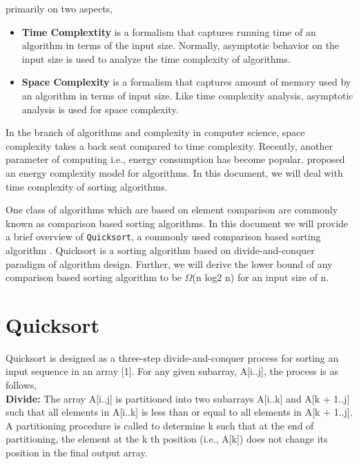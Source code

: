 \documentclass{article}
\begin{document}
\begin{multicols}{2}
primarily on two aspects,
\begin{itemize}
\itemsep0em
\item \textbf{Time Complextity} is a formalism that captures
running time of an algorithm in terms of
the input size. Normally, asymptotic behavior
on the input size is used to analyze the time
complexity of algorithms.
\item \textbf{Space Complexity} is a formalism that captures
amount of memory used by an algorithm
in terms of input size. Like time complexity
analysis, asymptotic analysis is used for space
complexity.\\
\end{itemize}
In the branch of algorithms and complexity in computer
science, space complexity takes a back seat
compared to time complexity. Recently, another
parameter of computing i.e., energy consumption
has become popular. \citep{4} proposed an energy
complexity model for algorithms. In this document,
we will deal with time complexity of sorting
algorithms.\par
One class of algorithms which are based on element
comparison are commonly known as comparison
based sorting algorithms. In this document we
will provide a brief overview of \texttt{Quicksort}, a commonly
used comparison based sorting algorithm \citep{2}.
Quicksort is a sorting algorithm based on divide-and-conquer
paradigm of algorithm design. Further,
we will derive the lower bound of any comparison
based sorting algorithm to be $\Omega$(n log2 n)
for an input size of n.
\\
\section{Quicksort}
Quicksort is designed as a three-step divide-and-conquer
process for sorting an input sequence in
an array [1]. For any given subarray, A[i..j], the
process is as follows,\\
\textbf{Divide: } The array A[i..j] is partitioned into two
subarrays A[i..k] and A[k + 1..j] such that all elements
in A[i..k] is less than or equal to all elements
in A[k + 1..j]. A partitioning procedure is called to
determine k such that at the end of partitioning,
the element at the k
th position (i.e., A[k]) does not
change its position in the final output array.
\end{multicols}
\newpage
\end{document}
